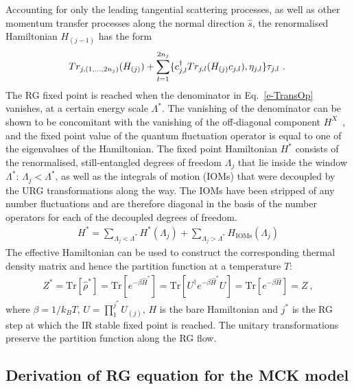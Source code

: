 \documentclass[10pt]{iopart}
\begin{document}
Accounting for only the leading tangential scattering processes, as well as other momentum transfer processes along the normal direction $\hat{s}$, the renormalised Hamiltonian \(H_{(j-1)}\) has the form~\cite{anirbanurg1}
\begin{eqnarray}
\hspace*{-0.1cm}Tr_{j,(1,\ldots,2n_{j})}(H_{(j)})+\sum_{l=1}^{2n_{j}}\lbrace c^{\dagger}_{j,l}Tr_{j,l}(H_{(j)}c_{j,l}),\eta_{j,l}\rbrace\tau_{j,l}~.\label{HRG}
\end{eqnarray}
The RG fixed point is reached when the denominator in Eq.~\ref{e-TransOp} vanishes, at a certain energy scale \(\Lambda^*\). The vanishing of the denominator can be shown to be concomitant with the vanishing of the off-diagonal component \(H^X\)~\cite{anirbanurg1}, and the fixed point value of the quantum fluctuation operator is equal to one of the eigenvalues of the Hamiltonian. The fixed point Hamiltonian \(H^*\) consists of the renormalised, still-entangled degrees of freedom \(\Lambda_j\) that lie inside the window \(\Lambda^*\): \(\Lambda_j < \Lambda^*\), as well as the integrals of motion (IOMs) that were decoupled by the URG transformations along the way. The IOMs have been stripped of any number fluctuations and are therefore diagonal in the basis of the number operators for each of the decoupled degrees of freedom.
\begin{eqnarray}
	H^* = \sum_{\Lambda_j < \Lambda^*} H^*(\Lambda_j) + \sum_{\Lambda_j > \Lambda^*}H_\text{IOMs}(\Lambda_j)
\end{eqnarray}
The effective Hamiltonian can be used to construct the corresponding thermal density matrix and hence the partition function at a temperature \(T\):
\begin{eqnarray}
Z^* = \mathrm{Tr}\left[ \hat{\rho}^*\right] = \mathrm{Tr}\left[ e^{-\beta \hat{H}^{*}}\right] = \mathrm{Tr}\left[ U^{\dagger} e^{-\beta \hat{H}^{*}} U\right] = \mathrm{Tr}\left[ e^{-\beta \hat{H}}\right] = Z
\label{partfunc}~,
\end{eqnarray}
where \(\beta = 1/k_B T\), \(U = \prod_{1}^{j^{*}}U_{(j)}\), $H$ is the bare Hamiltonian and $j^{*}$ is the RG step at which the IR stable fixed point is reached. The unitary transformations preserve the partition function along the RG flow.

\subsection{Derivation of RG equation for the MCK model}
\end{document}
